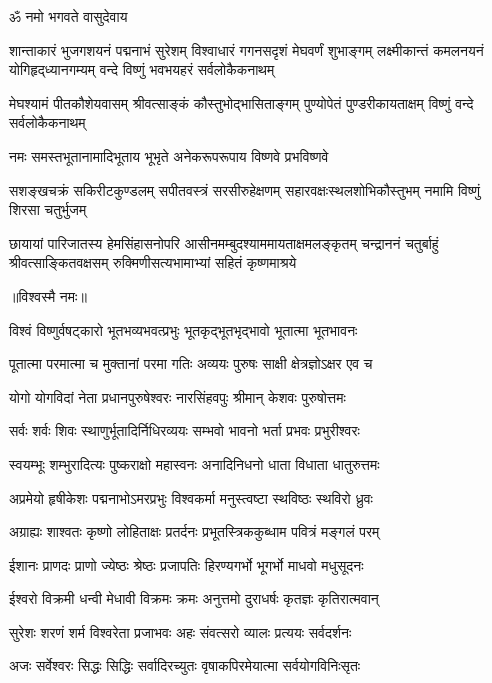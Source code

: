 \centerline{ॐ नमो भगवते वासुदेवाय}
\fourlineindentedshloka
{शान्ताकारं भुजगशयनं पद्मनाभं सुरेशम्}
{विश्वाधारं गगनसदृशं मेघवर्णं शुभाङ्गम्}
{लक्ष्मीकान्तं कमलनयनं योगिहृद्‌ध्यानगम्यम्}
{वन्दे विष्णुं भवभयहरं सर्वलोकैकनाथम्}

\fourlineindentedshloka
{मेघश्यामं पीतकौशेयवासम्}
{श्रीवत्साङ्कं कौस्तुभोद्भासिताङ्गम्}
{पुण्योपेतं पुण्डरीकायताक्षम्}
{विष्णुं वन्दे सर्वलोकैकनाथम्}

\twolineshloka
{नमः समस्तभूतानामादिभूताय भूभृते}
{अनेकरूपरूपाय विष्णवे प्रभविष्णवे}

\fourlineindentedshloka
{सशङ्खचक्रं सकिरीटकुण्डलम्}
{सपीतवस्त्रं सरसीरुहेक्षणम्}
{सहारवक्षःस्थलशोभिकौस्तुभम्}
{नमामि विष्णुं शिरसा चतुर्भुजम्}

\fourlineindentedshloka
{छायायां पारिजातस्य हेमसिंहासनोपरि}
{आसीनमम्बुदश्याममायताक्षमलङ्कृतम्}
{चन्द्राननं चतुर्बाहुं श्रीवत्साङ्कितवक्षसम्}
{रुक्मिणीसत्यभामाभ्यां सहितं कृष्णमाश्रये}

\centerline{॥विश्वस्मै नमः॥}\nopagebreak[4]
\resetShloka
\twolineshloka
{विश्वं विष्णुर्वषट्कारो भूतभव्यभवत्प्रभुः}
{भूतकृद्भूतभृद्भावो भूतात्मा भूतभावनः}

\twolineshloka
{पूतात्मा परमात्मा च मुक्तानां परमा गतिः}
{अव्ययः पुरुषः साक्षी क्षेत्रज्ञोऽक्षर एव च}

\twolineshloka
{योगो योगविदां नेता प्रधानपुरुषेश्वरः}
{नारसिंहवपुः श्रीमान् केशवः पुरुषोत्तमः}

\twolineshloka
{सर्वः शर्वः शिवः स्थाणुर्भूतादिर्निधिरव्ययः}
{सम्भवो भावनो भर्ता प्रभवः प्रभुरीश्वरः}

\twolineshloka
{स्वयम्भूः शम्भुरादित्यः पुष्कराक्षो महास्वनः}
{अनादिनिधनो धाता विधाता धातुरुत्तमः}

\twolineshloka
{अप्रमेयो हृषीकेशः पद्मनाभोऽमरप्रभुः}
{विश्वकर्मा मनुस्त्वष्टा स्थविष्ठः स्थविरो ध्रुवः}

\twolineshloka
{अग्राह्यः शाश्वतः कृष्णो लोहिताक्षः प्रतर्दनः}
{प्रभूतस्त्रिककुब्धाम पवित्रं मङ्गलं परम्}

\twolineshloka
{ईशानः प्राणदः प्राणो ज्येष्ठः श्रेष्ठः प्रजापतिः}
{हिरण्यगर्भो भूगर्भो माधवो मधुसूदनः}

\twolineshloka
{ईश्वरो विक्रमी धन्वी मेधावी विक्रमः क्रमः}
{अनुत्तमो दुराधर्षः कृतज्ञः कृतिरात्मवान्}

\twolineshloka
{सुरेशः शरणं शर्म विश्वरेता प्रजाभवः}
{अहः संवत्सरो व्यालः प्रत्ययः सर्वदर्शनः}

\twolineshloka
{अजः सर्वेश्वरः सिद्धः सिद्धिः सर्वादिरच्युतः}
{वृषाकपिरमेयात्मा सर्वयोगविनिःसृतः}

